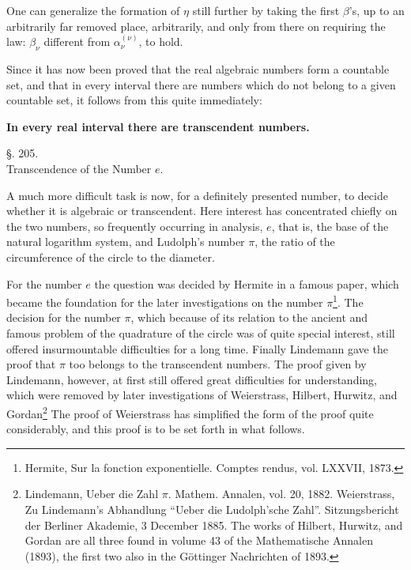\documentclass[11pt]{article}
\begin{document}
One can generalize the formation of $\eta$ still further by taking the first $\beta$'s, up to an arbitrarily far removed place, arbitrarily, and only from there on requiring the law: $\beta_\nu$ different from $\alpha_\nu^{(\nu)}$, to hold.

Since it has now been proved that the real algebraic numbers form a countable set, and that in every interval there are numbers which do not belong to a given countable set, it follows from this quite immediately:

\begin{center}
\textbf{In every real interval there are transcendent numbers.}
\end{center}

\begin{center}
{\large §. 205.}\\[0.4em]
{\large Transcendence of the Number $e$.}
\end{center}

A much more difficult task is now, for a definitely presented number, to decide whether it is algebraic or transcendent. Here interest has concentrated chiefly on the two numbers, so frequently occurring in analysis, $e$, that is, the base of the natural logarithm system, and Ludolph's number $\pi$, the ratio of the circumference of the circle to the diameter.

For the number $e$ the question was decided by Hermite in a famous paper, which became the foundation for the later investigations on the number $\pi$\footnote{Hermite, Sur la fonction exponentielle. Comptes rendus, vol. LXXVII, 1873.}. The decision for the number $\pi$, which because of its relation to the ancient and famous problem of the quadrature of the circle was of quite special interest, still offered insurmountable difficulties for a long time. Finally Lindemann gave the proof that $\pi$ too belongs to the transcendent numbers. The proof given by Lindemann, however, at first still offered great difficulties for understanding, which were removed by later investigations of Weierstrass, Hilbert, Hurwitz, and Gordan\footnote{Lindemann, Ueber die Zahl $\pi$. Mathem. Annalen, vol. 20, 1882. Weierstrass, Zu Lindemann's Abhandlung ``Ueber die Ludolph'sche Zahl''. Sitzungsbericht der Berliner Akademie, 3 December 1885. The works of Hilbert, Hurwitz, and Gordan are all three found in volume 43 of the Mathematische Annalen (1893), the first two also in the Göttinger Nachrichten of 1893.}
The proof of Weierstrass has simplified the form of the proof quite considerably, and this proof is to be set forth in what follows.
\end{document}

